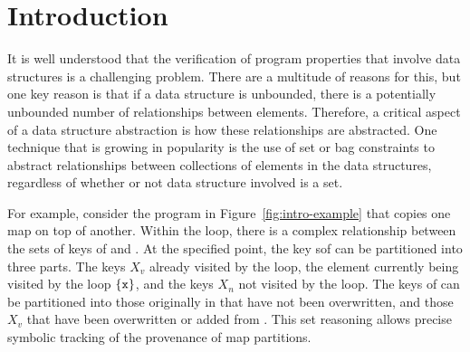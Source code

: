 \section{Introduction}
\label{s:1:intro}


It is well understood that the verification of program properties that involve data structures is a challenging problem.  There are a multitude of reasons for this, but one key reason is that if a data structure is unbounded, there is a potentially unbounded number of relationships between elements.  Therefore, a critical aspect of a data structure abstraction is how these relationships are abstracted.  One technique that is growing in popularity is the use of set or bag constraints to abstract relationships between collections of elements in the data structures, regardless of whether or not data structure involved is a set.

For example, consider the program in Figure~\ref{fig:intro-example} that copies one map on top of another.  Within the loop, there is a complex relationship between the sets of keys of  and .  At the specified point, the key sof  can be partitioned into three parts.  The keys $X_v$ already visited by the loop, the element currently being visited by the loop $\{\texttt{x}\}$, and the keys $X_n$ not visited by the loop.  The keys of  can be partitioned into those originally in  that have not been overwritten, and those $X_v$ that have been overwritten or added from .  This set reasoning allows precise symbolic tracking of the provenance of map partitions.

